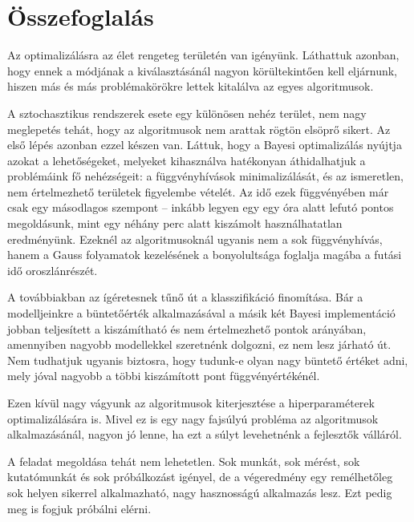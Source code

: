 \chapter{Összefoglalás}

Az optimalizálásra az élet rengeteg területén van igényünk. Láthattuk azonban, hogy ennek a módjának a kiválasztásánál nagyon körültekintően kell eljárnunk, hiszen más és más problémakörökre lettek kitalálva az egyes algoritmusok. 

A sztochasztikus rendszerek esete egy különösen nehéz terület, nem nagy meglepetés tehát, hogy az algoritmusok nem arattak rögtön elsöprő sikert. Az első lépés azonban ezzel készen van. Láttuk, hogy a Bayesi optimalizálás nyújtja azokat a lehetőségeket, melyeket kihasználva hatékonyan áthidalhatjuk a problémáink fő nehézségeit: a függvényhívások minimalizálását, és az ismeretlen, nem értelmezhető területek figyelembe vételét. Az idő ezek függvényében már csak egy másodlagos szempont -- inkább legyen egy egy óra alatt lefutó pontos megoldásunk, mint egy néhány perc alatt kiszámolt használhatatlan eredményünk. Ezeknél az algoritmusoknál ugyanis nem a sok függvényhívás, hanem a Gauss folyamatok kezelésének a bonyolultsága foglalja magába a futási idő oroszlánrészét.

A továbbiakban az ígéretesnek tűnő út a klasszifikáció finomítása. Bár a modelljeinkre a büntetőérték alkalmazásával a másik két Bayesi implementáció jobban teljesített a kiszámítható és nem értelmezhető pontok arányában, amennyiben nagyobb modellekkel szeretnénk dolgozni, ez nem lesz járható út. Nem tudhatjuk ugyanis biztosra, hogy tudunk-e olyan nagy büntető értéket adni, mely jóval nagyobb a többi kiszámított pont függvényértékénél.

Ezen kívül nagy vágyunk az algoritmusok kiterjesztése a hiperparaméterek optimalizálására is. Mivel ez is egy nagy fajsúlyú probléma az algoritmusok alkalmazásánál, nagyon jó lenne, ha ezt a súlyt levehetnénk a fejlesztők válláról.

A feladat megoldása tehát nem lehetetlen. Sok munkát, sok mérést, sok kutatómunkát és sok próbálkozást igényel, de a végeredmény egy remélhetőleg sok helyen sikerrel alkalmazható, nagy hasznosságú alkalmazás lesz. Ezt pedig meg is fogjuk próbálni elérni.